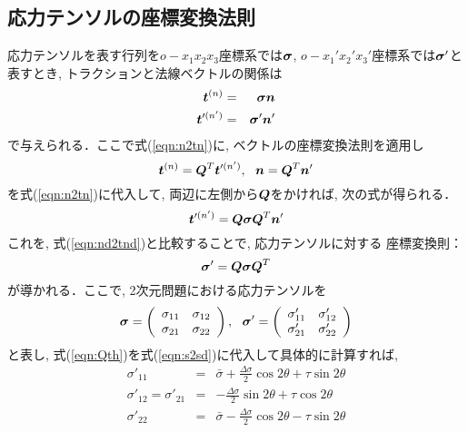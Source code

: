 \documentclass[10pt,a4j]{jarticle}
\begin{document}
\subsection{応力テンソルの座標変換法則}
応力テンソルを表す行列を$o-x_1x_2x_3$座標系では$\mbox{\boldmath $\sigma$}$, 
$o-x_1'x_2'x_3'$座標系では$\mbox{\boldmath $\sigma$}'$と表すとき,
トラクションと法線ベクトルの関係は
\begin{eqnarray}
	\mbox{\boldmath $t$}^{(n)} &=& \mbox{\boldmath $\sigma$}\mbox{\boldmath $n$} 
		\label{eqn:n2tn} \\
	\mbox{\boldmath $t$}'^{(n')} &=& \mbox{\boldmath $\sigma$}'\mbox{\boldmath $n$}'
		\label{eqn:nd2tnd} 
\end{eqnarray}
で与えられる．ここで式(\ref{eqn:n2tn})に, ベクトルの座標変換法則を適用し
\begin{equation}
	\fat{t}^{(n)}=\fat{Q}^T \fat{t}'^{(n')}, \ \ 
	\fat{n} = \fat{Q}^T \fat{n}'
\end{equation}
を式(\ref{eqn:n2tn})に代入して, 両辺に左側から$\mbox{\boldmath $Q$}$をかければ, 
次の式が得られる．
\begin{equation}
	\mbox{\boldmath $t$}'^{(n')}=\mbox{\boldmath $Q$} \mbox{\boldmath $\sigma$} \mbox{\boldmath $Q$}^T \mbox{\boldmath $n$}'
\end{equation}
これを, 式(\ref{eqn:nd2tnd})と比較することで, 応力テンソルに対する
座標変換則：
\begin{equation}
	\mbox{\boldmath $\sigma$}'=\mbox{\boldmath $Q$}\mbox{\boldmath $\sigma$}\mbox{\boldmath $Q$}^T
	\label{eqn:s2sd}
\end{equation}
が導かれる．ここで, 2次元問題における応力テンソルを
\begin{equation}
	\fat{\sigma}=\left(
		\begin{array}{cc}
		 \sigma_{11} & \sigma_{12} \\
		 \sigma_{21} & \sigma_{22} 
		\end{array}
	\right)
	, \ \ 
	\fat{\sigma}'=\left(
		\begin{array}{cc}
	 \sigma'_{11} & \sigma'_{12} \\
	 \sigma'_{21} & \sigma'_{22} 
	\end{array}
	\right)
\end{equation}
と表し, 式(\ref{eqn:Qth})を式(\ref{eqn:s2sd})に代入して具体的に計算すれば, 
\begin{eqnarray}
	\sigma'_{11} &=& \bar{\sigma} + \frac{\Delta \sigma}{2} \cos 2\theta + \tau \sin 2\theta
		\label{eqn:s11d} \\
	\sigma'_{12}=\sigma'_{21} &=& - \frac{\Delta \sigma}{2} \sin 2\theta + \tau \cos 2\theta
		\label{eqn:s12d} \\
	\sigma'_{22} &=& \bar{\sigma} - \frac{\Delta \sigma}{2} \cos 2\theta - \tau \sin 2\theta 
		\label{eqn:s22d}
\end{eqnarray}
\end{document}
